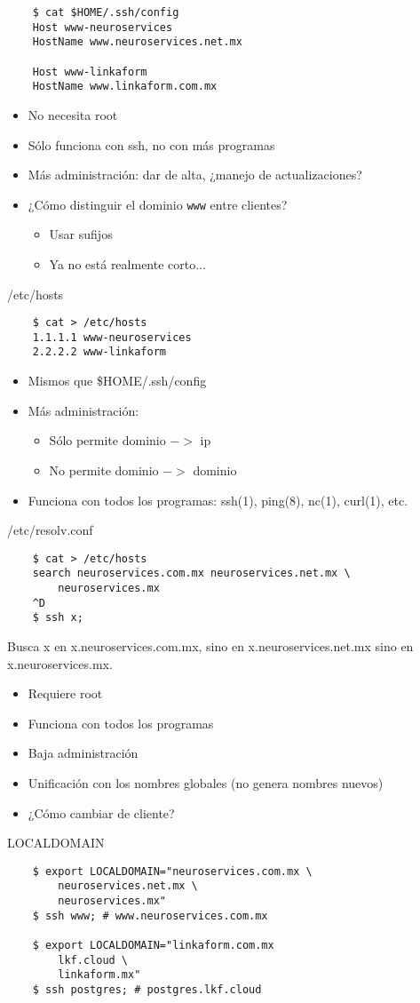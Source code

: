 \documentclass[11pt,spanish]{article}
\newcommand{\rowsp}[1][1em]{\vspace{#1}}
\newcommand{\hone}[1]{{\rowsp[0.3em]\noindent\Large #1 \rowsp[0.3em]}}
\newcommand{\myitm}[1]{\begin{itemize}#1\end{itemize}}
\newcommand{\pros}{\item[pros:]}
\newcommand{\cons}{\item[cons:]}
\begin{document}
\begin{lstlisting}
	$ cat $HOME/.ssh/config
	Host www-neuroservices
	HostName www.neuroservices.net.mx

	Host www-linkaform
	HostName www.linkaform.com.mx
\end{lstlisting}

\myitm{
	\pros No necesita root
	\cons Sólo funciona con ssh, no con más programas
	\cons Más administración: dar de alta, ¿manejo de actualizaciones?
	\cons ¿Cómo distinguir el dominio \lstinline{www} entre clientes?
	\myitm{
		\item Usar sufijos
		\item Ya no está realmente corto...
	}
}

\newpage %

\hone{/etc/hosts}

\begin{lstlisting}
	$ cat > /etc/hosts
	1.1.1.1 www-neuroservices
	2.2.2.2 www-linkaform
\end{lstlisting}

\myitm{
	\cons Mismos que \$HOME/.ssh/config
	\cons Más administración:
	\myitm{
		\item Sólo permite dominio $->$ ip
		\item No permite dominio $->$ dominio
	}
	\pros Funciona con todos los programas: ssh(1), ping(8), nc(1), curl(1), etc.
}

\newpage %

\hone{/etc/resolv.conf}

\begin{lstlisting}
	$ cat > /etc/hosts
	search neuroservices.com.mx neuroservices.net.mx \
		neuroservices.mx
	^D
	$ ssh x;
\end{lstlisting}

Busca x en x.neuroservices.com.mx, sino en x.neuroservices.net.mx sino en
x.neuroservices.mx.

\myitm{
	\cons Requiere root
	\pros Funciona con todos los programas
	\pros Baja administración
	\pros Unificación con los nombres globales (no genera nombres nuevos)
	\item ¿Cómo cambiar de cliente?
}

\newpage %

\hone{LOCALDOMAIN}

\begin{lstlisting}
	$ export LOCALDOMAIN="neuroservices.com.mx \
		neuroservices.net.mx \
		neuroservices.mx"
	$ ssh www; # www.neuroservices.com.mx

	$ export LOCALDOMAIN="linkaform.com.mx
		lkf.cloud \
		linkaform.mx"
	$ ssh postgres; # postgres.lkf.cloud
\end{lstlisting}
\end{document}
